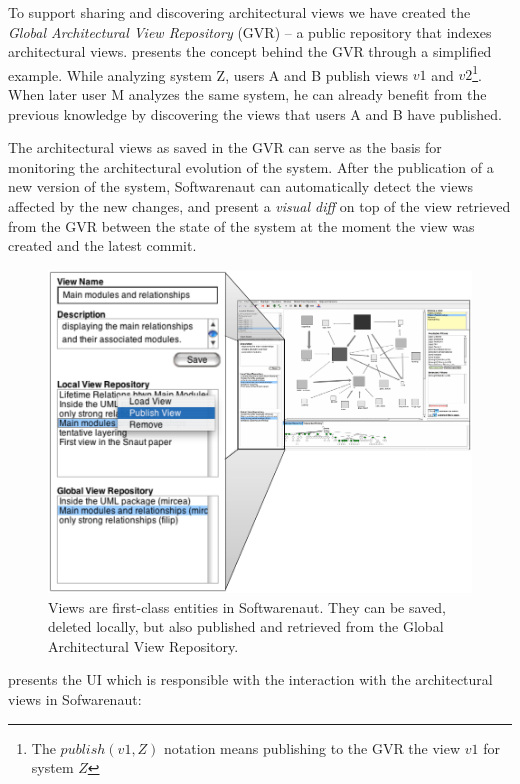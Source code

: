 \documentclass[preprint,12pt]{elsarticle}
\begin{document}
To support sharing and discovering architectural views we have created the {\em Global Architectural View Repository} (GVR) -- a public repository that indexes architectural views.  presents the concept behind the GVR through a simplified example. While analyzing system Z, users A and B publish views $v1$ and $v2$\footnote{The $publish(v1,Z)$ notation means publishing to the GVR the view $v1$ for system $Z$}. When later user M analyzes the same system, he can already benefit from the previous knowledge by discovering the views that users A and B have published. 


The architectural views as saved in the GVR can serve as the basis for monitoring the architectural evolution of the system. After the publication of a new version of the system, Softwarenaut can automatically detect the views affected by the new changes, and present a {\em visual diff} on top of the view retrieved from the GVR between the state of the system at the moment the view was created and the latest commit.

\begin{figure}[ht]
\begin{center}
\includegraphics[width=0.75\linewidth]{ViewOperations}
\caption{Views are first-class entities in Softwarenaut. They can be saved, deleted locally, but also published and retrieved from the Global Architectural View Repository.}
\end{center}
\end{figure}

 presents the UI which is responsible with the interaction with the architectural views in Sofwarenaut: 
\end{document}
